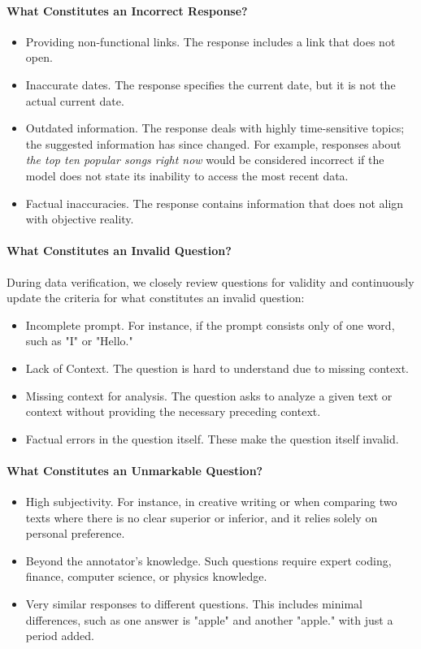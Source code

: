 \documentclass[11pt]{article}
\theoremstyle{plain}
\theoremstyle{definition}
\theoremstyle{remark}
\begin{document}
\paragraph{What Constitutes an Incorrect Response?}
\begin{itemize}[left=0cm]
    \item Providing non-functional links. The response includes a link that does not open.
    \item Inaccurate dates. The response specifies the current date, but it is not the actual current date.
    \item Outdated information. The response deals with highly time-sensitive topics; the suggested information has since changed. For example, responses about \textit{the top ten popular songs right now} would be considered incorrect if the model does not state its inability to access the most recent data.
    \item Factual inaccuracies. The response contains information that does not align with objective reality.
\end{itemize}


\paragraph{What Constitutes an Invalid Question?}
During data verification, we closely review questions for validity and continuously update the criteria for what constitutes an invalid question:

\begin{itemize}[left=0cm]
\item Incomplete prompt. For instance, if the prompt consists only of one word, such as "I" or "Hello."
\item Lack of Context. The question is hard to understand due to missing context.
\item Missing context for analysis. The question asks to analyze a given text or context without providing the necessary preceding context.
\item Factual errors in the question itself. These make the question itself invalid.
\end{itemize}

\paragraph{What Constitutes an Unmarkable Question?}
\begin{itemize}[left=0cm]
\item High subjectivity. For instance, in creative writing or when comparing two texts where there is no clear superior or inferior, and it relies solely on personal preference.
\item Beyond the annotator’s knowledge. Such questions require expert coding, finance, computer science, or physics knowledge.
\item Very similar responses to different questions. This includes minimal differences, such as one answer is "apple" and another "apple." with just a period added.
\end{itemize}
\end{document}
